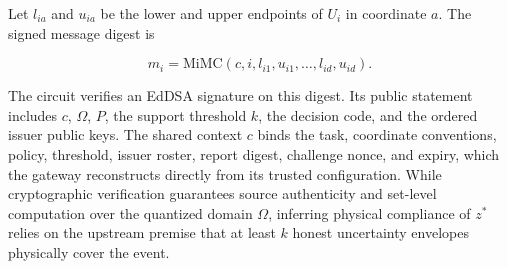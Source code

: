 Let $l_{ia}$ and $u_{ia}$ be the lower and upper endpoints of $U_i$ in coordinate $a$. The signed message digest is

\begin{equation}\label{eq:signedbox}
m_i = \mathrm{MiMC}(c, i, l_{i1}, u_{i1}, \dots, l_{id}, u_{id}).
\end{equation}


The circuit verifies an EdDSA signature on this digest. Its public statement includes $c$, $\Omega$, $P$, the support threshold $k$, the decision code, and the ordered issuer public keys. The shared context $c$ binds the task, coordinate conventions, policy, threshold, issuer roster, report digest, challenge nonce, and expiry, which the gateway reconstructs directly from its trusted configuration. While cryptographic verification guarantees source authenticity and set-level computation over the quantized domain $\Omega$, inferring physical compliance of $z^*$ relies on the upstream premise that at least $k$ honest uncertainty envelopes physically cover the event.
